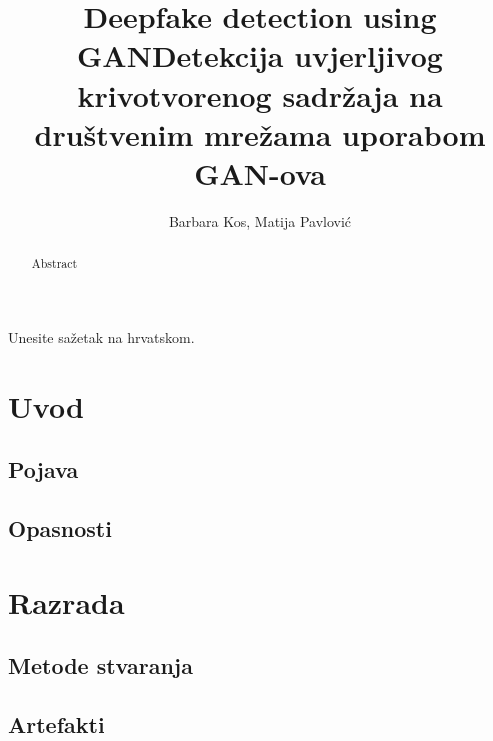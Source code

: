 \documentclass[seminarski, times, utf8]{fer}
\title{Deepfake detection using GAN}
\title{Detekcija uvjerljivog krivotvorenog sadržaja na društvenim mrežama uporabom GAN-ova}
\author{Barbara Kos, Matija Pavlović}
\date{}
\date{}
\begin{document}
\maketitle



\begin{sazetak}
  Unesite sažetak na hrvatskom.
\end{sazetak}

\begin{kljucnerijeci}
 
\end{kljucnerijeci}

\begin{abstract}
  Abstract
\end{abstract}

\begin{keywords}
 
\end{keywords}


\tableofcontents


\chapter{Uvod}
\label{pog:uvod}
\section{Pojava}
\section{Opasnosti}

\chapter{Razrada}
\section{Metode stvaranja}
\section{Artefakti}
\end{document}
